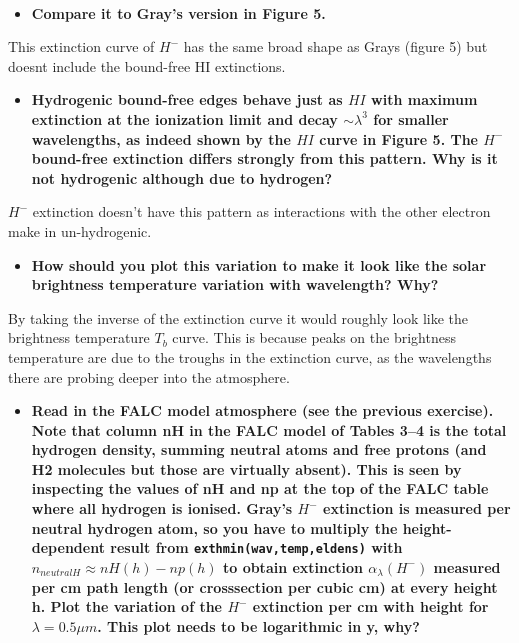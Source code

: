 \documentclass{article}
\providecommand{\tightlist}{%
      \setlength{\itemsep}{0pt}\setlength{\parskip}{0pt}}
\begin{document}
    \begin{center}
    \end{center}
    { \hspace*{\fill} \\}
    
    \begin{itemize}
\tightlist
\item
  \textbf{Compare it to Gray's version in Figure 5.}
\end{itemize}

This extinction curve of \(H^-\) has the same broad shape as Grays
(figure 5) but doesnt include the bound-free HI extinctions.

\begin{itemize}
\tightlist
\item
  \textbf{Hydrogenic bound-free edges behave just as \(HI\) with maximum
  extinction at the ionization limit and decay \(\sim \lambda^3\) for
  smaller wavelengths, as indeed shown by the \(HI\) curve in Figure 5.
  The \(H^-\) bound-free extinction differs strongly from this pattern.
  Why is it not hydrogenic although due to hydrogen?}
\end{itemize}

\(H^-\) extinction doesn't have this pattern as interactions with the
other electron make in un-hydrogenic.

\begin{itemize}
\tightlist
\item
  \textbf{How should you plot this variation to make it look like the
  solar brightness temperature variation with wavelength? Why?}
\end{itemize}

By taking the inverse of the extinction curve it would roughly look like
the brightness temperature \(T_b\) curve. This is because peaks on the
brightness temperature are due to the troughs in the extinction curve,
as the wavelengths there are probing deeper into the atmosphere.

\begin{itemize}
\tightlist
\item
  \textbf{Read in the FALC model atmosphere (see the previous exercise).
  Note that column nH in the FALC model of Tables 3--4 is the total
  hydrogen density, summing neutral atoms and free protons (and H2
  molecules but those are virtually absent). This is seen by inspecting
  the values of nH and np at the top of the FALC table where all
  hydrogen is ionised. Gray's \(H^-\) extinction is measured per neutral
  hydrogen atom, so you have to multiply the height-dependent result
  from \texttt{exthmin(wav,temp,eldens)} with
  \(n_{neutral H} \approx nH(h) - np(h)\) to obtain extinction
  \(\alpha_{\lambda}(H^-)\) measured per cm path length (or crosssection
  per cubic cm) at every height h. Plot the variation of the \(H^-\)
  extinction per cm with height for \(\lambda = 0.5 \mu m\). This plot
  needs to be logarithmic in y, why?}
\end{itemize}
\end{document}
